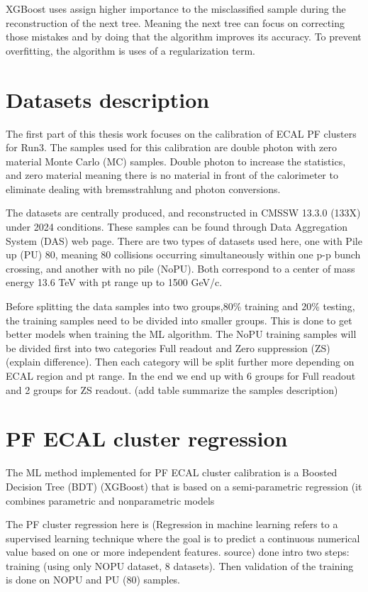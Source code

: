 XGBoost uses assign higher importance to the misclassified sample during the reconstruction of the next tree. Meaning the next tree can focus on correcting those mistakes and by doing that the algorithm improves its accuracy. To prevent overfitting, the algorithm is uses of a regularization term.


\section{Datasets description}

The first part of this thesis work focuses on the calibration of ECAL PF clusters for Run3. The samples used for this calibration are double photon with zero material Monte Carlo (MC) samples. Double photon to increase the statistics, and zero material meaning there is no material in front of the calorimeter to eliminate dealing with bremsstrahlung and photon conversions.

The datasets are centrally produced, and reconstructed in CMSSW 13.3.0 (133X) under 2024 conditions. These samples can be found through Data Aggregation System (DAS) web page. There are two types of datasets used here, one with Pile up (PU) 80, meaning 80 collisions occurring simultaneously within one p-p bunch crossing, %
and another with no pile (NoPU). Both correspond to a center of mass energy 13.6 TeV with pt range up to 1500 GeV/c.

Before splitting the data samples into two groups,80\% training and 20\% testing, the training samples need to be divided into smaller groups. This is done to get better models when training the ML algorithm. The NoPU training samples will be divided first into two categories Full readout and Zero suppression (ZS) (explain difference). %
Then each category will be split further more depending on ECAL region and pt range. In the end we end up with 6 groups for Full readout and 2 groups for ZS readout. (add table summarize the samples description)  


\section{PF ECAL cluster regression}
The ML method implemented for PF ECAL cluster calibration is a Boosted Decision Tree (BDT) (XGBoost) that is based on a semi-parametric regression (it combines parametric and nonparametric models %

The PF cluster regression here is (Regression in machine learning refers to a supervised learning technique where the goal is to predict a continuous numerical value based on one or more independent features. source) done intro two steps: training (using only NOPU dataset, 8 datasets). Then validation of the training is done on NOPU and PU (80) samples.

